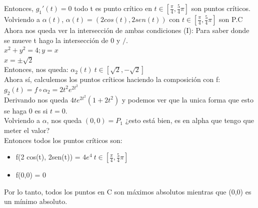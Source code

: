 \documentclass[10pt,a4paper]{article}
\begin{document}
Entonces, $g_{1}'(t) = 0$ todo t es punto crítico en $t \in [\frac{\pi}{4}, \frac{5}{4}\pi]$ son puntos críticos. \\
Volviendo a $\alpha(t)$, $\alpha(t) = (2 cos(t), 2 sen(t))$ con $t \in [\frac{\pi}{4}, \frac{5}{4}\pi]$ son P.C \\
Ahora nos queda ver la intersección de ambas condiciones (I): Para saber donde se mueve t hago la intersección de 0 y $/$. \\
$x^{2} + y^{2} = 4; y = x$ \\
$x = \pm \sqrt{2}$ \\
Entonces, nos queda: $\alpha_{2}(t) \ t \in [\sqrt{2}, -\sqrt{2}]$ \\
Ahora sí, calculemos los puntos críticos haciendo la composición con f: $g_{2}(t) = f \circ \alpha_{2} = 2t^{2}e^{2t^{2}}$ \\
Derivando nos queda $4te^{2t^{2}}(1+2t^{2})$ y podemos ver que la unica forma que esto se haga 0 es si $t=0$. \\
Volviendo a $\alpha$, nos queda $(0,0) = P_{1}$ ¿esto está bien, es en alpha que tengo que meter el valor? \\
Entonces todos los puntos críticos son: 
\begin{itemize}
    \item f(2 cos(t), 2sen(t)) = $4e^{4} \ t \in [\frac{\pi}{4}, \frac{5}{4}\pi]$
    \item f(0,0) = 0
\end{itemize}
Por lo tanto, todos los puntos en C son máximos absolutos mientras que (0,0) es un mínimo absoluto.
\end{document}
